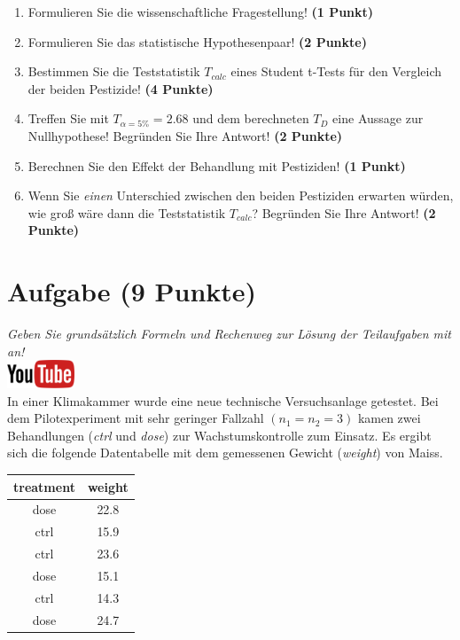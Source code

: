 \documentclass[a4paper, 9pt]{scrartcl}\usepackage[]{graphicx}\usepackage[]{xcolor}
\begin{document}
\begin{enumerate}
  \item Formulieren Sie die wissenschaftliche Fragestellung! \textbf{(1 Punkt)}
  \item Formulieren Sie das statistische Hypothesenpaar! \textbf{(2
      Punkte)}
  \item Bestimmen Sie die Teststatistik $T_{calc}$ eines Student t-Tests f{\"u}r den
  Vergleich der beiden Pestizide! \textbf{(4 Punkte)}
\item Treffen Sie mit $T_{\alpha = 5\%} = 2.68$ und dem berechneten $T_{D}$ eine Aussage
  zur Nullhypothese! Begr{\"u}nden Sie Ihre Antwort! \textbf{(2 Punkte)}
\item Berechnen Sie den Effekt der Behandlung mit Pestiziden! \textbf{(1 Punkt)}
\item Wenn Sie \textit{einen} Unterschied zwischen den beiden
  Pestiziden erwarten w{\"u}rden, wie gro{\ss} w{\"a}re dann die Teststatistik
  $T_{calc}$? Begr{\"u}nden Sie Ihre Antwort! \textbf{(2 Punkte)}
\end{enumerate} 
\clearpage

\section{Aufgabe \hfill (9 Punkte)}

\textit{Geben Sie grunds{\"a}tzlich Formeln und Rechenweg zur L{\"o}sung der
  Teilaufgaben mit an!} \\[1Ex]

\hfill\href{https://youtu.be/eejS2uG4o-M}{\includegraphics[width =
  2cm]{img/youtube}}\\[1Ex]



In einer Klimakammer wurde eine neue technische Versuchsanlage getestet. Bei dem
Pilotexperiment mit sehr geringer Fallzahl $(n_1 = n_2 = 3)$ kamen zwei
Behandlungen (\textit{ctrl} und \textit{dose}) zur Wachstumskontrolle zum
Einsatz. Es ergibt sich die folgende Datentabelle mit dem gemessenen
Gewicht (\textit{weight}) von Maiss.

\begin{table}[!h]
\centering
\begin{tabular}{cc}
\toprule
treatment & weight\\
\midrule
dose & 22.8\\
ctrl & 15.9\\
ctrl & 23.6\\
dose & 15.1\\
ctrl & 14.3\\
\addlinespace
dose & 24.7\\
\bottomrule
\end{tabular}
\end{table}
\end{document}
